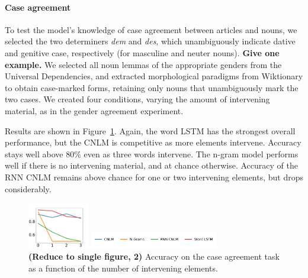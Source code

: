 \paragraph{Case agreement}
To test the model's knowledge of case agreement between articles and
nouns, we selected the two determiners \emph{dem} and \emph{des},
which unambiguously indicate dative and genitive case, respectively
(for masculine and neuter nouns). \textbf{Give one example.}  We selected all noun lemmas of the
appropriate genders from the Universal Dependencies, and extracted
morphological paradigms from Wiktionary to obtain case-marked forms,
retaining only nouns that unambiguously mark the two cases.  We created
four conditions, varying the amount of intervening material, as in the
gender agreement experiment.

Results are shown in Figure~\ref{fig:case}.  Again, the word LSTM has
the strongest overall performance, but the CNLM is competitive as more
elements intervene. Accuracy stays well above 80\% even as three
words intervene.  The n-gram model performs well if there is no
intervening material, and at chance otherwise.  Accuracy of the RNN
CNLM remains above chance for one or two intervening elements, but
drops considerably.

\begin{figure}

\centering\includegraphics[width=0.24\textwidth]{figures/german-case-total.pdf}

\includegraphics[width=0.5\textwidth]{figures/german-legend.pdf}
	\caption{\textbf{(Reduce to single figure, 2)} Accuracy on the case agreement task as a function of the number of intervening elements.}\label{fig:case}
\end{figure}

